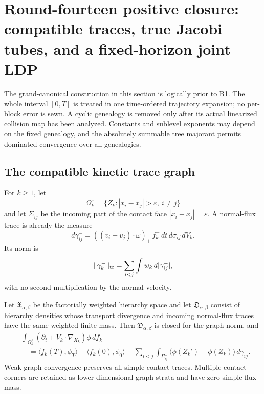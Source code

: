 
\section{Round-fourteen positive closure: compatible traces, true Jacobi tubes, and a fixed-horizon joint LDP}
\label{sec:r14-b2}

The grand-canonical construction in this section is logically prior to B1.
The whole interval \([0,T]\) is treated in one time-ordered trajectory
expansion; no per-block error is sewn.  A cyclic genealogy is removed only
after its actual linearized collision map has been analyzed.  Constants and
sublevel exponents may depend on the fixed genealogy, and the absolutely
summable tree majorant permits dominated convergence over all genealogies.

\subsection{The compatible kinetic trace graph}

For \(k\ge1\), let
\[
 \Omega_k^\varepsilon
 =\{Z_k:|x_i-x_j|>\varepsilon,\ i\ne j\}
\]
and let \(\Sigma_{ij}^-\) be the incoming part of the contact face
\(|x_i-x_j|=\varepsilon\).  A normal-flux trace is already the measure
\[
 d\gamma_{ij}^-
 =((v_i-v_j)\cdot\omega)_+\,f_k^-\,
   dt\,d\sigma_{ij}\,dV_k .
\]
Its norm is
\[
 \|\gamma_k^-\|_{\rm tr}
 =\sum_{i<j}\int w_k\,d|\gamma_{ij}^-|,
\]
with no second multiplication by the normal velocity.

\begin{theorem}
\label{thm:r14-b2-trace}
Let \(\mathfrak X_{\alpha,\beta}\) be the factorially weighted hierarchy
space and let \(\mathfrak D_{\alpha,\beta}\) consist of hierarchy densities
whose transport divergence and incoming normal-flux traces have the same
weighted finite mass.  Then \(\mathfrak D_{\alpha,\beta}\) is closed for the
graph norm, and
\[
 \begin{aligned}
 &\int_{\Omega_k^\varepsilon}
  (\partial_t+V_k\cdot\nabla_{X_k})\phi\,df_k\\
 &\quad=
 \langle f_k(T),\phi_T\rangle-\langle f_k(0),\phi_0\rangle
 -\sum_{i<j}\int_{\Sigma_{ij}^-}
  \bigl(\phi(Z_k')-\phi(Z_k)\bigr)\,d\gamma_{ij}^- .
 \end{aligned}
\]
Weak graph convergence preserves all simple-contact traces.  Multiple-contact
corners are retained as lower-dimensional graph strata and have zero
simple-flux mass.
\end{theorem}


